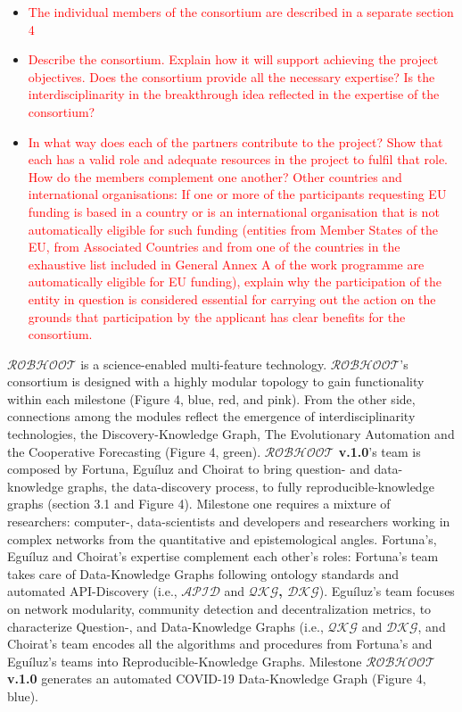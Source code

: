 \documentclass[11pt, a4paper]{article} %
\begin{document}
  \begin{itemize}
  \item \textcolor{red}{The individual members of the consortium are
      described in a separate section 4}
    \item \textcolor{red}{Describe the consortium. Explain how it will
        support achieving the project objectives.  Does the consortium
        provide all the necessary expertise? Is the
        interdisciplinarity in the breakthrough idea reflected in the
        expertise of the consortium?}
    \item \textcolor{red}{In what way does each of the partners
        contribute to the project? Show that each has a valid role and
        adequate resources in the project to fulfil that role. How do
        the members complement one another? Other countries and
        international organisations: If one or more of the
        participants requesting EU funding is based in a country or is
        an international organisation that is not automatically
        eligible for such funding (entities from Member States of the
        EU, from Associated Countries and from one of the countries in
        the exhaustive list included in General Annex A of the work
        programme are automatically eligible for EU funding), explain
        why the participation of the entity in question is considered
        essential for carrying out the action on the grounds that
        participation by the applicant has clear benefits for the
        consortium.}
  \end{itemize}

  {\bf $\mathcal{ROBHOOT}$} is a science-enabled multi-feature
  technology. $\mathcal{ROBHOOT}$'s consortium is designed with a
  highly modular topology to gain functionality within each milestone
  (Figure 4, blue, red, and pink). From the other side, connections
  among the modules reflect the emergence of interdisciplinarity
  technologies, the Discovery-Knowledge Graph, The Evolutionary
  Automation and the Cooperative Forecasting (Figure 4, green). {\bf
    $\mathcal{ROBHOOT}$ v.1.0}'s team is composed by Fortuna,
  Egu\'iluz and Choirat to bring question- and data-knowledge graphs,
  the data-discovery process, to fully reproducible-knowledge graphs
  (section 3.1 and Figure 4). Milestone one requires a mixture of
  researchers: computer-, data-scientists and developers and
  researchers working in complex networks from the quantitative and
  epistemological angles. Fortuna's, Egu\'iluz and Choirat's expertise
  complement each other's roles: Fortuna's team takes care of
  Data-Knowledge Graphs following ontology standards and automated
  API-Discovery (i.e., {\bf $\mathcal{APID}$} and {\bf
    $\mathcal{QKG}$, $\mathcal{DKG}$}). Egu\'iluz's team focuses on
  network modularity, community detection and decentralization
  metrics, to characterize Question-, and Data-Knowledge Graphs (i.e.,
  {\bf $\mathcal{QKG}$} and {\bf $\mathcal{DKG}$}, and Choirat's team
  encodes all the algorithms and procedures from Fortuna's and
  Egu\'iluz's teams into Reproducible-Knowledge Graphs. Milestone {\bf
    $\mathcal{ROBHOOT}$ v.1.0} generates an automated COVID-19
  Data-Knowledge Graph (Figure 4, blue).
\end{document}
